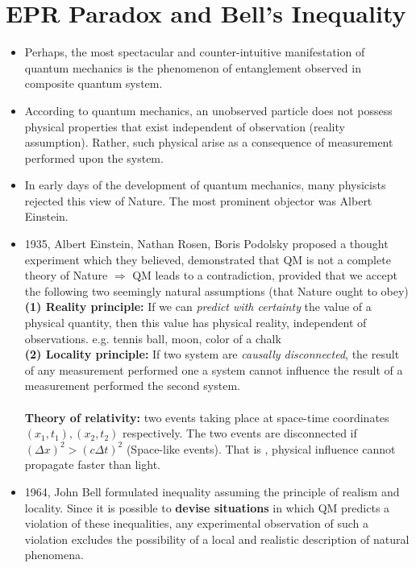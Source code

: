 \documentclass[]{book}
\theoremstyle{nonumberplain}
\begin{document}
\section{EPR Paradox and Bell's Inequality} \label{par:epr_paradox_and_bell_s_inequality}
\begin{itemize}
	\item Perhaps, the most spectacular and counter-intuitive manifestation of quantum mechanics is the phenomenon of entanglement observed in composite quantum system. 
	\item According to quantum mechanics, an unobserved particle does not possess physical properties that exist independent of observation (reality assumption). Rather, such physical arise as a consequence of measurement performed upon the system.
	\item In early days of the development of quantum mechanics, many physicists rejected this view of Nature. The most prominent objector was Albert Einstein.
	\item 1935, Albert Einstein, Nathan Rosen, Boris Podolsky proposed a thought experiment which they believed, demonstrated that QM is not a complete theory of Nature $\Rightarrow$ QM leads to a contradiction, provided that we accept the following two seemingly natural assumptions (that Nature ought to obey) \\
		\textbf{(1) Reality principle:}  If we can \emph{predict with certainty} the value of a physical quantity, then this value has physical reality, independent of observations. e.g. tennis ball, moon, color of a chalk \\
		\textbf{(2) Locality principle:} If two system are \emph{causally disconnected}, the result of any measurement performed one a system cannot influence the result of a measurement performed the second system.  \\ \\
		\textbf{Theory of relativity:} two events taking place at space-time coordinates $(x_{1},t_{1}), (x_{2},t_{2})$ respectively. The two events are disconnected if $(\Delta x)^{2} > (c\Delta t)^{2}$ (Space-like events). That is , physical influence cannot propagate faster than light.
	\item 1964, John Bell formulated inequality assuming the principle of realism and locality. Since it is possible to \textbf{devise situations} in which QM predicts a violation of these inequalities, any experimental observation of such a violation excludes the possibility of a local and realistic description of natural phenomena.

\end{itemize}
\end{document}
